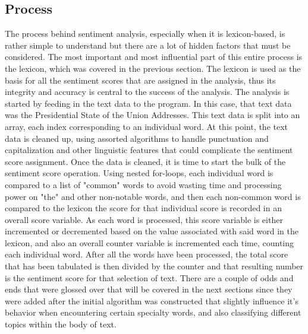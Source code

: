 \subsection{Process}
The process behind sentiment analysis, especially when it is lexicon-based, is rather simple to understand but there are a lot of hidden factors that must be considered.
The most important and most influential part of this entire process is the lexicon, which was covered in the previous section.
The lexicon is used as the basis for all the sentiment scores that are assigned in the analysis, thus its integrity and accuracy is central to the success of the analysis.
The analysis is started by feeding in the text data to the program. 
In this case, that text data was the Presidential State of the Union Addresses.
This text data is split into an array, each index corresponding to an individual word.
At this point, the text data is cleaned up, using assorted algorithms to handle punctuation and capitalization and other linguistic features that could complicate the sentiment score assignment.
Once the data is cleaned, it is time to start the bulk of the sentiment score operation.
Using nested for-loops, each individual word is compared to a list of "common" words to avoid wasting time and processing power on "the" and other non-notable words, and then each non-common word is compared to the lexicon the score for that individual score is recorded in an overall score variable.
As each word is processed, this score variable is either incremented or decremented based on the value associated with said word in the lexicon, and also an overall counter variable is incremented each time, counting each individual word.
After all the words have been processed, the total score that has been tabulated is then divided by the counter and that resulting number is the sentiment score for that selection of text.
There are a couple of odds and ends that were glossed over that will be covered in the next sections since they were added after the initial algorithm was constructed that slightly influence it's behavior when encountering certain specialty words, and also classifying different topics within the body of text.

